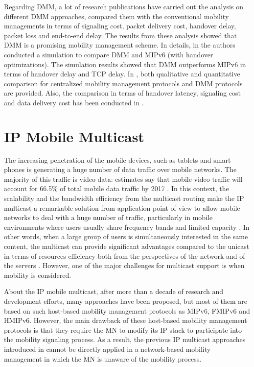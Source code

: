 Regarding DMM, a lot of research publications \cite{DMM_Bertin, PMIP_based_DMM_Giust, DMM_IETF_Lee, MIP_based_DMM_Condeixa, MIP_based_DMM_Hassan, DMM_analysis_Hassan} have carried out the analysis on different DMM approaches, compared them with the conventional mobility managements in terms of signaling cost, packet delivery cost, handover delay, packet loss and end-to-end delay. The results from these analysis showed that DMM is a promising mobility management scheme. In details, in \cite{DMM_Bertin} the authors conducted a simulation to compare DMM and MIPv6 (with handover optimizations). The simulation results showed that DMM outperforms MIPv6 in terms of handover delay and TCP delay. In \cite{DMM_IETF_Lee}, both qualitative and quantitative comparison for centralized mobility management protocols and DMM protocols are provided. Also, the comparison in terms of handover latency, signaling cost and data delivery cost has been conducted in \cite{MIP_based_DMM_Condeixa}. 

\section{IP Mobile Multicast}
The increasing penetration of the mobile devices, such as tablets and smart phones is generating a huge number of data traffic over mobile networks. The majority of this traffic is video data: estimates say that mobile video traffic will account for 66.5\% of total mobile data traffic by 2017 \cite{cisco_forecast}. In this context, the scalability and the bandwidth efficiency from the multicast routing make the IP multicast a remarkable solution from application point of view to allow mobile networks to deal with a huge number of traffic, particularly in mobile environments where users usually share frequency bands and limited capacity \cite{Multicast_MIPv6}. In other words, when a large group of users is simultaneously interested in the same content, the multicast can provide significant advantages compared to the unicast in terms of resources efficiency both from the perspectives of the network and of the servers \cite{developing_ip_multicast}. However, one of the major challenges for multicast support is when mobility is considered.

About the IP mobile multicast, after more than a decade of research and development efforts, many approaches have been proposed, but most of them are based on such host-based mobility management protocols as MIPv6, FMIPv6 and HMIPv6. However, the main drawback of these host-based mobility management protocols is that they require the MN to modify its IP stack to participate into the mobility signaling process. As a result, the previous IP multicast approaches introduced in \cite{Multicast_MIPv6, multicast_challenges_solutions} cannot be directly applied in a network-based mobility management in which the MN is unaware of the mobility process.

